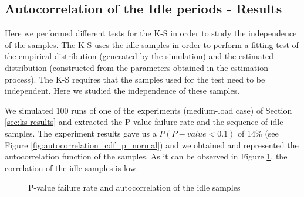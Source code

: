 \subsection{Autocorrelation of the Idle periods - Results} \label{sec:autocorrelation_idle_results}
Here we performed different tests for the \acs{K-S} in order to study the independence of the samples. The \acs{K-S} uses the idle samples in order to perform a fitting test of the empirical distribution (generated by the simulation) and the estimated distribution (constructed from the parameters obtained in the estimation process). The \acs{K-S} requires that the samples used for the test need to be independent. Here we studied the independence of these samples.

We simulated 100 runs of one of the experiments (medium-load case) of Section \ref{sec:ks-results} and extracted the P-value failure rate and the sequence of idle samples. The experiment results gave us a $P(P-value<0.1)$ of 14\% (see Figure \ref{fig:autocorrelation_cdf_p_normal}) and we obtained and represented the autocorrelation function of the samples. As it can be observed in Figure \ref{fig:autocorrelation_idle_normal}, the correlation of the idle samples is low.

\begin{figure}[h!]
	\centering
	\caption{P-value failure rate and autocorrelation of the idle samples}
	\label{fig:autocorrelation_idle_normal}
\end{figure}

